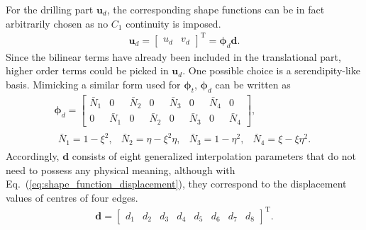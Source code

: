 \documentclass[3p,sort&compress,review,11pt]{elsarticle}
\newcommand*{\mT}{\mathrm{T}}
\newcommand*{\eqsref}[1]{Eq.~(\ref{#1})}
\begin{document}
For the drilling part $\mathbold{u}_d$, the corresponding shape functions can be in fact arbitrarily chosen as no $C_1$ continuity is imposed.
\begin{gather}\label{eq:interpolation_displacement}
\mathbold{u}_d=\begin{bmatrix}u_d&v_d\end{bmatrix}^\mT=\mathbold{\phi}_d\mathbold{d}.
\end{gather}
Since the bilinear terms have already been included in the translational part, higher order terms could be picked in $\mathbold{u}_d$. One possible choice is a serendipity-like basis. Mimicking a similar form used for $\mathbold{\phi}_t$, $\mathbold{\phi}_d$ can be written as
\begin{gather}
\mathbold{\phi}_d=\begin{bmatrix}
\bar{N}_1&0&\bar{N}_2&0&\bar{N}_3&0&\bar{N}_4&0\\
0&\bar{N}_1&0&\bar{N}_2&0&\bar{N}_3&0&\bar{N}_4
\end{bmatrix},\\\label{eq:shape_function_displacement}
\begin{array}{llll}
\bar{N}_1=1-\xi^2,&\bar{N}_2=\eta-\xi^2\eta,&\bar{N}_3=1-\eta^2,&\bar{N}_4=\xi-\xi\eta^2.
\end{array}
\end{gather}
Accordingly, $\mathbold{d}$ consists of eight generalized interpolation parameters that do not need to possess any physical meaning, although with \eqsref{eq:shape_function_displacement}, they correspond to the displacement values of centres of four edges.
\begin{gather*}
\mathbold{d}=\begin{bmatrix}
d_1&d_2&d_3&d_4&d_5&d_6&d_7&d_8
\end{bmatrix}^\mT.
\end{gather*}
\end{document}
